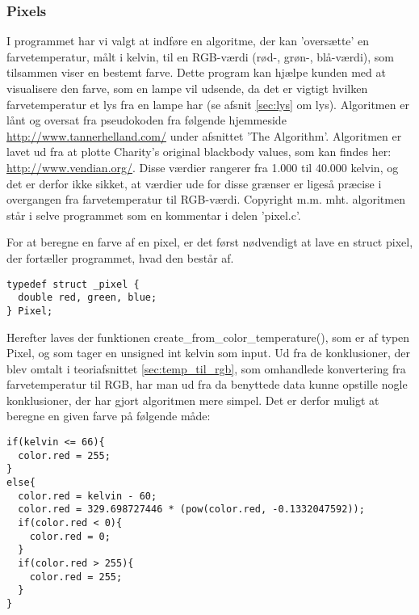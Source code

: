 \subsubsection{Pixels}
I programmet har vi valgt at indføre en algoritme, der kan ’oversætte’ en farvetemperatur, målt i kelvin, til en RGB-værdi (rød-, grøn-, blå-værdi), som tilsammen viser en bestemt farve. Dette program kan hjælpe kunden med at visualisere den farve, som en lampe vil udsende, da det er vigtigt hvilken farvetemperatur et lys fra en lampe har (se afsnit \ref{sec:lys} om lys). Algoritmen er lånt og oversat fra pseudokoden fra følgende hjemmeside \href{http://www.tannerhelland.com/4435/convert-temperature-rgb-algorithm-code/}{http://www.tannerhelland.com/} under afsnittet 'The Algorithm'. Algoritmen er lavet ud fra at plotte Charity’s original blackbody values, som kan findes her: \href{http://www.vendian.org/mncharity/dir3/blackbody/UnstableURLs/bbr_color.html}{http://www.vendian.org/}. Disse værdier rangerer fra 1.000 til 40.000 kelvin, og det er derfor ikke sikket, at værdier ude for disse grænser er ligeså præcise i overgangen fra farvetemperatur til RGB-værdi. Copyright m.m. mht. algoritmen står i selve programmet som en kommentar i delen ’pixel.c’.


For at beregne en farve af en pixel, er det først nødvendigt at lave en struct pixel, der fortæller programmet, hvad den består af. 
\begin{lstlisting}[style=Cstyle, caption=Struct af Pixel]
typedef struct _pixel {
  double red, green, blue;
} Pixel;
\end{lstlisting}

Herefter laves der funktionen create_from_color_temperature(), som er af typen Pixel, og som tager en unsigned int kelvin som input. Ud fra de konklusioner, der blev omtalt i teoriafsnittet \ref{sec:temp_til_rgb}, som omhandlede konvertering fra farvetemperatur til RGB, har man ud fra da benyttede data kunne opstille nogle konklusioner, der har gjort algoritmen mere simpel. Det er derfor muligt at beregne en given farve på følgende måde: 
\begin{lstlisting}[style=Cstyle, caption=Beregning af rød farve]
if(kelvin <= 66){
  color.red = 255;
}
else{
  color.red = kelvin - 60;
  color.red = 329.698727446 * (pow(color.red, -0.1332047592));
  if(color.red < 0){
    color.red = 0;
  }
  if(color.red > 255){
    color.red = 255;
  }
}
\end{lstlisting}